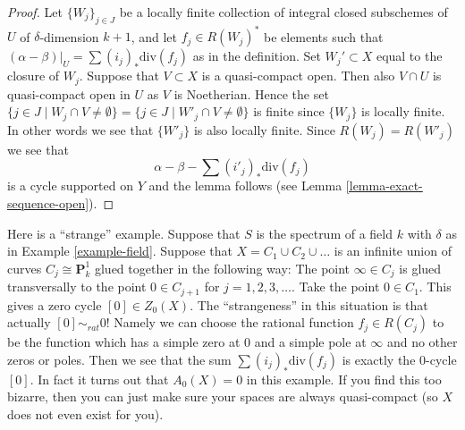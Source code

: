 \begin{proof}
Let $\{W_j\}_{j \in J}$ be a locally finite collection of integral closed
subschemes of $U$ of $\delta$-dimension $k + 1$, and let $f_j \in R(W_j)^*$
be elements such that $(\alpha - \beta)|_U = \sum (i_j)_*\text{div}(f_j)$
as in the definition. Set $W_j' \subset X$ equal
to the closure of $W_j$. Suppose that $V \subset X$ is a quasi-compact
open. Then also $V \cap U$ is quasi-compact open in $U$ as
$V$ is Noetherian. Hence the set
$\{j \in J \mid W_j \cap V \not = \emptyset\}
= \{j \in J \mid W'_j \cap V \not = \emptyset\}$
is finite since $\{W_j\}$ is locally finite. In other words we see that
$\{W'_j\}$ is also locally finite. Since $R(W_j) = R(W'_j)$ we see
that
$$
\alpha - \beta - \sum (i'_j)_*\text{div}(f_j)
$$
is a cycle supported on $Y$ and the lemma follows (see
Lemma \ref{lemma-exact-sequence-open}).
\end{proof}

\begin{example}
\label{example-weird}
Here is a ``strange'' example.
Suppose that $S$ is the spectrum of a field $k$
with $\delta$ as in Example \ref{example-field}.
Suppose that $X = C_1 \cup C_2 \cup \ldots$ is an infinite
union of curves $C_j \cong \mathbf{P}^1_k$ glued together
in the following way: The point $\infty \in C_j$ is glued
transversally to the point $0 \in C_{j + 1}$ for $j = 1, 2, 3, \ldots$.
Take the point $0 \in C_1$. This gives a zero cycle
$[0] \in Z_0(X)$. The ``strangeness'' in this situation is
that actually $[0] \sim_{rat} 0$! Namely we can choose
the rational function $f_j \in R(C_j)$ to be the function
which has a simple zero at $0$ and a simple pole at $\infty$
and no other zeros or poles. Then we see that the sum
$\sum (i_j)_*\text{div}(f_j)$ is exactly the $0$-cycle
$[0]$. In fact it turns out that $A_0(X) = 0$ in this example.
If you find this too bizarre, then you can just
make sure your spaces are always quasi-compact
(so $X$ does not even exist for you).
\end{example}

